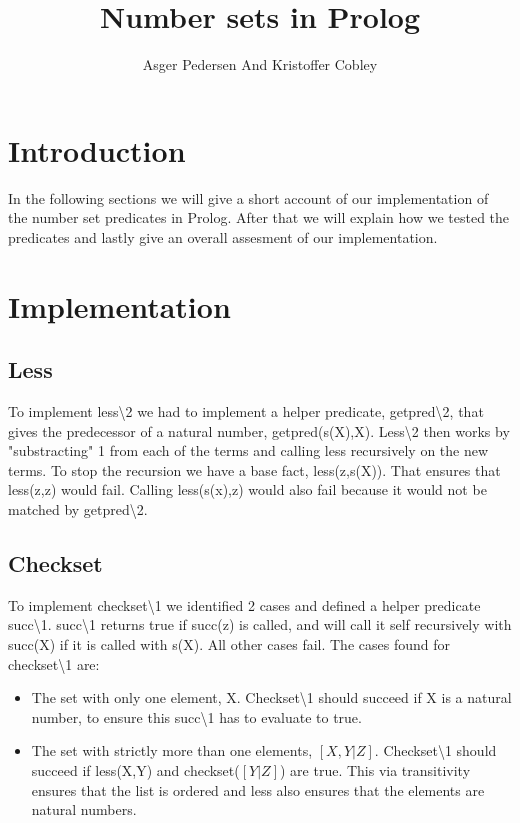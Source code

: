 \documentclass[]{article}
\title{Number sets in Prolog}
\author{ Asger Pedersen And Kristoffer Cobley}
\begin{document}
\ifpdf
{}
\else
{}
\fi

\maketitle
\setcounter{tocdepth}{1}
\tableofcontents
\newpage
\section{Introduction} %
\label{sec:introduction}
In the following sections we will give a short account of our implementation of the number set predicates in Prolog. After that we will explain how we tested the predicates and lastly give an overall assesment of our implementation.
\section{Implementation}
\subsection{Less} %
\label{sec:less}
To implement less\textbackslash2 we had to implement a helper predicate, getpred\textbackslash2, that gives the predecessor of a natural number, getpred(s(X),X). Less\textbackslash2 then works by "substracting" 1 from each of the terms and calling less recursively on the new terms. To stop the recursion we have a base fact, less(z,s(X)). That ensures that less(z,z) would fail. Calling less(s(x),z) would also fail because it would not be matched by getpred\textbackslash2.
\subsection{Checkset} %
\label{sec:checkset}
To implement checkset\textbackslash1 we identified 2 cases and defined a helper predicate succ\textbackslash1. succ\textbackslash1 returns true if succ(z) is called, and will call it self recursively with succ(X) if it is called with s(X). All other cases fail. The cases found for checkset\textbackslash1 are:
\begin{itemize}
	\item The set with only one element, X. Checkset\textbackslash1 should succeed if X is a natural number, to ensure this succ\textbackslash1 has to evaluate to true.
	
	\item The set with strictly more than one elements, $[X,Y|Z]$. Checkset\textbackslash1 should succeed if less(X,Y) and checkset($[Y|Z]$) are true. This via transitivity ensures that the list is ordered and less also  ensures that the elements are natural numbers.
\end{itemize}	
\end{document}
